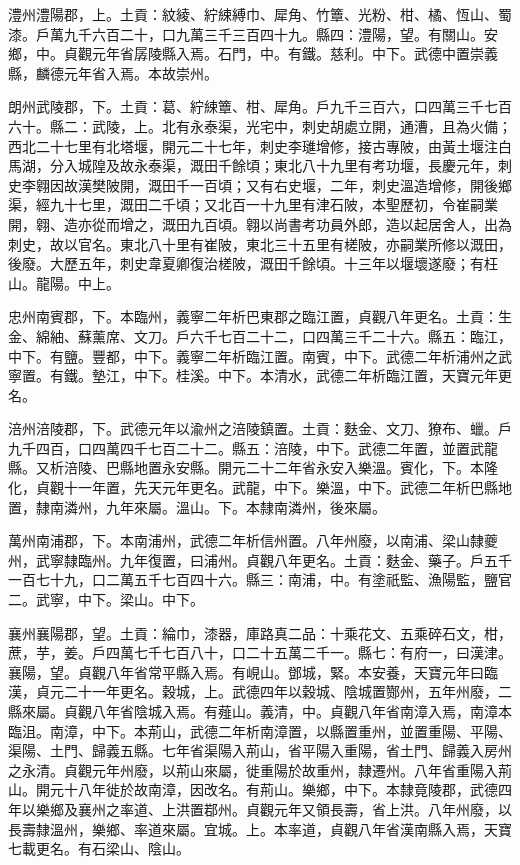 \begin{pinyinscope}
 澧州澧陽郡，上。土貢：紋綾、紵綀縛巾、犀角、竹簟、光粉、柑、橘、恆山、蜀漆。戶萬九千六百二十，口九萬三千三百四十九。縣四：澧陽，望。有關山。安鄉，中。貞觀元年省孱陵縣入焉。石門，中。有鐵。慈利。中下。武德中置崇義縣，麟德元年省入焉。本故崇州。



 朗州武陵郡，下。土貢：葛、紵綀簟、柑、犀角。戶九千三百六，口四萬三千七百六十。縣二：武陵，上。北有永泰渠，光宅中，刺史胡處立開，通漕，且為火備；西北二十七里有北塔堰，開元二十七年，刺史李璡增修，接古專陂，由黃土堰注白馬湖，分入城隍及故永泰渠，溉田千餘頃；東北八十九里有考功堰，長慶元年，刺史李翱因故漢樊陂開，溉田千一百頃；又有右史堰，二年，刺史溫造增修，開後鄉渠，經九十七里，溉田二千頃；又北百一十九里有津石陂，本聖歷初，令崔嗣業開，翱、造亦從而增之，溉田九百頃。翱以尚書考功員外郎，造以起居舍人，出為刺史，故以官名。東北八十里有崔陂，東北三十五里有槎陂，亦嗣業所修以溉田，後廢。大歷五年，刺史韋夏卿復治槎陂，溉田千餘頃。十三年以堰壞遂廢；有枉山。龍陽。中上。



 忠州南賓郡，下。本臨州，義寧二年析巴東郡之臨江置，貞觀八年更名。土貢：生金、綿紬、蘇薰席、文刀。戶六千七百二十二，口四萬三千二十六。縣五：臨江，中下。有鹽。豐都，中下。義寧二年析臨江置。南賓，中下。武德二年析浦州之武寧置。有鐵。墊江，中下。桂溪。中下。本清水，武德二年析臨江置，天寶元年更名。



 涪州涪陵郡，下。武德元年以渝州之涪陵鎮置。土貢：麩金、文刀、獠布、蠟。戶九千四百，口四萬四千七百二十二。縣五：涪陵，中下。武德二年置，並置武龍縣。又析涪陵、巴縣地置永安縣。開元二十二年省永安入樂溫。賓化，下。本隆化，貞觀十一年置，先天元年更名。武龍，中下。樂溫，中下。武德二年析巴縣地置，隸南潾州，九年來屬。溫山。下。本隸南潾州，後來屬。



 萬州南浦郡，下。本南浦州，武德二年析信州置。八年州廢，以南浦、梁山隸夔州，武寧隸臨州。九年復置，曰浦州。貞觀八年更名。土貢：麩金、藥子。戶五千一百七十九，口二萬五千七百四十六。縣三：南浦，中。有塗祇監、漁陽監，鹽官二。武寧，中下。梁山。中下。



 襄州襄陽郡，望。土貢：綸巾，漆器，庫路真二品：十乘花文、五乘碎石文，柑，蔗，芋，姜。戶四萬七千七百八十，口二十五萬二千一。縣七：有府一，曰漢津。襄陽，望。貞觀八年省常平縣入焉。有峴山。鄧城，緊。本安養，天寶元年曰臨漢，貞元二十一年更名。穀城，上。武德四年以穀城、陰城置酂州，五年州廢，二縣來屬。貞觀八年省陰城入焉。有薤山。義清，中。貞觀八年省南漳入焉，南漳本臨沮。南漳，中下。本荊山，武德二年析南漳置，以縣置重州，並置重陽、平陽、渠陽、土門、歸義五縣。七年省渠陽入荊山，省平陽入重陽，省土門、歸義入房州之永清。貞觀元年州廢，以荊山來屬，徙重陽於故重州，隸遷州。八年省重陽入荊山。開元十八年徙於故南漳，因改名。有荊山。樂鄉，中下。本隸竟陵郡，武德四年以樂鄉及襄州之率道、上洪置鄀州。貞觀元年又領長壽，省上洪。八年州廢，以長壽隸溫州，樂鄉、率道來屬。宜城。上。本率道，貞觀八年省漢南縣入焉，天寶七載更名。有石梁山、陰山。




\end{pinyinscope}
